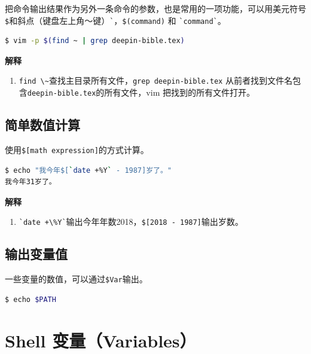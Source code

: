 \documentclass[doctor,openright,twoside]{sjtuthesis}
\providecommand{\tightlist}{%
    \setlength{\itemsep}{0pt}\setlength{\parskip}{0pt}}
\newcommand{\passthrough}[1]{#1}
\theoremstyle{plain}
\theoremstyle{definition}
\theoremstyle{remark}
\theoremstyle{ocrenumbox}
\theoremstyle{plain}
\begin{document}
把命令输出结果作为另外一条命令的参数，也是常用的一项功能，可以用美元符号\passthrough{\lstinline!$!}和斜点（键盘左上角～键）\passthrough{\lstinline!`!}，\passthrough{\lstinline!$(command)!} 和 \passthrough{\lstinline!`command`!}。

\begin{lstlisting}[language=bash]
$ vim -p $(find ~ | grep deepin-bible.tex)
\end{lstlisting}

\textbf{解释}

\begin{enumerate}
\def\labelenumi{\arabic{enumi}.}
\tightlist
\item
  \passthrough{\lstinline!find \~!}查找主目录所有文件，\passthrough{\lstinline!grep deepin-bible.tex!} 从前者找到文件名包含\passthrough{\lstinline!deepin-bible.tex!}的所有文件，vim 把找到的所有文件打开。
\end{enumerate}

\hypertarget{section-53}{%
\subsection{简单数值计算}\label{section-53}}

使用\passthrough{\lstinline!$[math expression]!}的方式计算。

\begin{lstlisting}[language=bash]
$ echo "我今年$[`date +%Y` - 1987]岁了。"
我今年31岁了。
\end{lstlisting}

\textbf{解释}

\begin{enumerate}
\def\labelenumi{\arabic{enumi}.}
\tightlist
\item
  \passthrough{\lstinline!`date +\%Y`!}输出今年年数2018，\passthrough{\lstinline!$[2018 - 1987]!}输出岁数。
\end{enumerate}

\hypertarget{section-54}{%
\subsection{输出变量值}\label{section-54}}

一些变量的数值，可以通过\passthrough{\lstinline!$Var!}输出。

\begin{lstlisting}[language=bash]
$ echo $PATH
\end{lstlisting}

\hypertarget{shell-variables}{%
\section{Shell 变量（Variables）}\label{shell-variables}}
\end{document}
